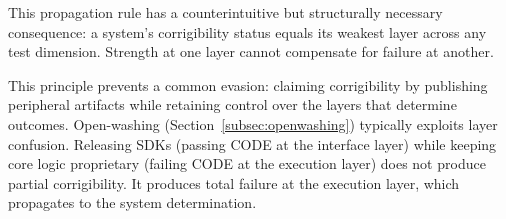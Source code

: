 This propagation rule has a counterintuitive but structurally necessary consequence: a system's corrigibility status equals its weakest layer across any test dimension. Strength at one layer cannot compensate for failure at another.

This principle prevents a common evasion: claiming corrigibility by publishing peripheral artifacts while retaining control over the layers that determine outcomes. Open-washing (Section~\ref{subsec:openwashing}) typically exploits layer confusion. Releasing SDKs (passing CODE at the interface layer) while keeping core logic proprietary (failing CODE at the execution layer) does not produce partial corrigibility. It produces total failure at the execution layer, which propagates to the system determination.